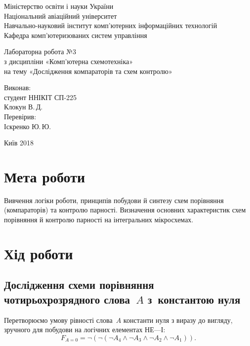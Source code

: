 \documentclass[a4paper,oneside,DIV=12,12pt,headings=normal]{scrartcl}
\begin{document}
	\begin{titlepage}
	\centering
		Міністерство освіти і науки України\\
		Національний авіаційний університет\\
		Навчально-науковий інститут комп'ютерних інформаційних технологій\\
		Кафедра комп'ютеризованих систем управління

		\vspace*{\fill}

		Лабораторна робота №3\\
		з дисципліни «Комп'ютерна схемотехніка»\\
		на тему «Дослідження компараторів та схем контролю»

		\vspace*{\fill}
		
		\begin{flushright}
			Виконав:\\
			студент ННІКІТ СП-225\\
			Клокун В.\,Д.\\
			Перевірив:\\
			Іскренко Ю.\,Ю.
		\end{flushright}

		Київ 2018
    \end{titlepage}
	
	\section{Мета роботи}
		Вивчення логіки роботи, принципів побудови й синтезу схем порівняння (компараторів) та контролю парності. Визначення основних характеристик схем порівняння й контролю парності на інтегральних мікросхемах.
	
	\section{Хід роботи}
		\subsection{Дослідження схеми порівняння чотирьохрозрядного слова~$A$ з~константою нуля}
			Перетворюємо умову рівності слова~$A$ константи нуля з виразу до вигляду, зручного для побудови на логічних елементах НЕ—І:
			\begin{equation}
			\label{eqn:eqn-01}
				F_{A = 0} = \neg \left( \neg \left( \neg A_4 \land \neg A_3 \land \neg A_2 \land \neg A_1 \right) \right).
			\end{equation}
			
\end{document}
